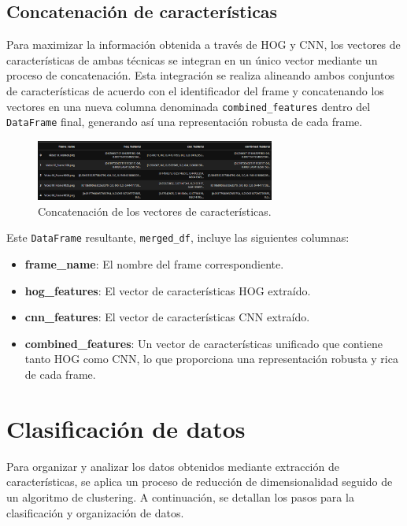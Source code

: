 \subsection{Concatenación de características}
Para maximizar la información obtenida a través de HOG y CNN, los vectores de características de ambas técnicas se integran en un único vector mediante un proceso de concatenación. Esta integración se realiza alineando ambos conjuntos de características de acuerdo con el identificador del frame y concatenando los vectores en una nueva columna denominada \texttt{combined\_features} dentro del \texttt{DataFrame} final, generando así una representación robusta de cada frame.

\begin{figure}[H]
    \centering
    \includegraphics[width=0.70\textwidth]{4/figures/Caracteristicas_3.png}
    \caption{Concatenación de los vectores de características.}
    \label{fig:convolucion}
\end{figure}

Este \texttt{DataFrame} resultante, \texttt{merged\_df}, incluye las siguientes columnas:
\begin{itemize}
    \item \textbf{frame\_name}: El nombre del frame correspondiente.
    \item \textbf{hog\_features}: El vector de características HOG extraído.
    \item \textbf{cnn\_features}: El vector de características CNN extraído.
    \item \textbf{combined\_features}: Un vector de características unificado que contiene tanto HOG como CNN, lo que proporciona una representación robusta y rica de cada frame.
\end{itemize}

\section{Clasificación de datos}
Para organizar y analizar los datos obtenidos mediante extracción de características, se aplica un proceso de reducción de dimensionalidad seguido de un algoritmo de clustering. A continuación, se detallan los pasos para la clasificación y organización de datos.

